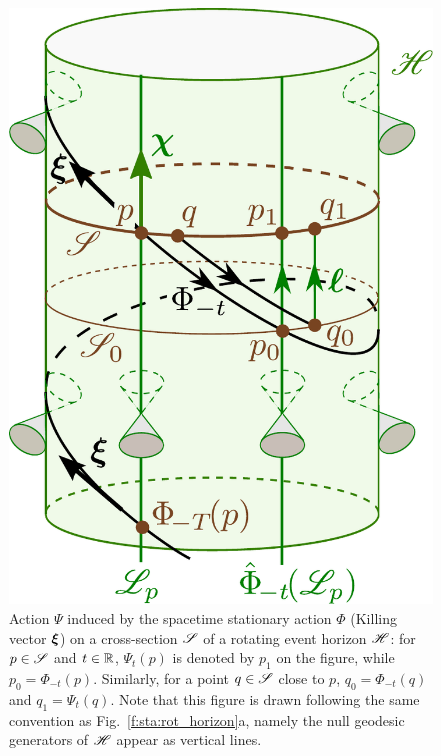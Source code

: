 \begin{figure}
\centerline{\includegraphics[height=0.4\textheight]{sta_axisym_sections.pdf}}
\caption[]{\label{f:sta:axisym_sections} \footnotesize
Action $\Psi$ induced by the spacetime stationary action $\Phi$ (Killing vector $\bm{\xi}$)
on a cross-section $\mathscr{S}$ of a rotating event horizon $\mathscr{H}$: for $p\in\mathscr{S}$ and $t\in\mathbb{R}$,
$\Psi_t(p)$ is denoted by $p_1$ on the figure, while
$p_0 = \Phi_{-t}(p)$. Similarly, for a point $q\in\mathscr{S}$
close to $p$, $q_0 = \Phi_{-t}(q)$ and $q_1 = \Psi_t(q)$. Note that this figure is
drawn following the same convention as Fig.~\ref{f:sta:rot_horizon}a, namely the
null geodesic generators of $\mathscr{H}$ appear as vertical lines.
}
\end{figure}



